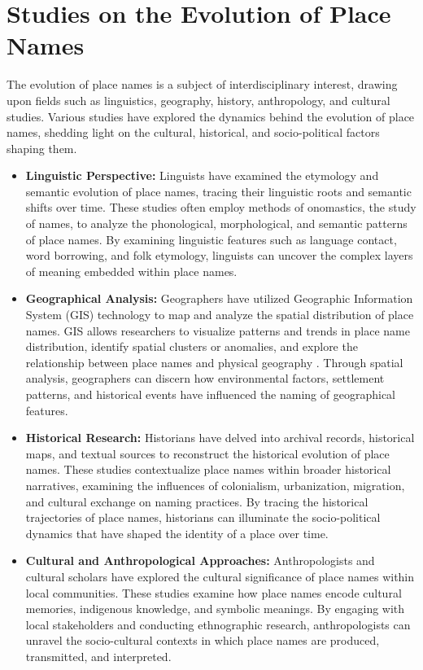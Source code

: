 \section{Studies on the Evolution of Place Names}
The evolution of place names is a subject of interdisciplinary interest, drawing upon fields such as linguistics, geography, history, anthropology, and cultural studies. Various studies have explored the dynamics behind the evolution of place names, shedding light on the cultural, historical, and socio-political factors shaping them.
\begin{itemize}
    \item {\textbf{Linguistic Perspective:}}
Linguists have examined the etymology and semantic evolution of place names, tracing their linguistic roots and semantic shifts over time. These studies often employ methods of onomastics, the study of names, to analyze the phonological, morphological, and semantic patterns of place names\cite{Gelling}. By examining linguistic features such as language contact, word borrowing, and folk etymology, linguists can uncover the complex layers of meaning embedded within place names.
	\item \textbf{Geographical Analysis:}
Geographers have utilized Geographic Information System (GIS) technology to map and analyze the spatial distribution of place names. GIS allows researchers to visualize patterns and trends in place name distribution, identify spatial clusters or anomalies, and explore the relationship between place names and physical geography \cite{Bolstad}. Through spatial analysis, geographers can discern how environmental factors, settlement patterns, and historical events have influenced the naming of geographical features.
	\item \textbf{Historical Research:}
Historians have delved into archival records, historical maps, and textual sources to reconstruct the historical evolution of place names. These studies contextualize place names within broader historical narratives, examining the influences of colonialism, urbanization, migration, and cultural exchange on naming practices. By tracing the historical trajectories of place names, historians can illuminate the socio-political dynamics that have shaped the identity of a place over time.
	\item \textbf{Cultural and Anthropological Approaches:}
Anthropologists and cultural scholars have explored the cultural significance of place names within local communities. These studies examine how place names encode cultural memories, indigenous knowledge, and symbolic meanings\cite{Gelling}. By engaging with local stakeholders and conducting ethnographic research, anthropologists can unravel the socio-cultural contexts in which place names are produced, transmitted, and interpreted.

\end{itemize}
